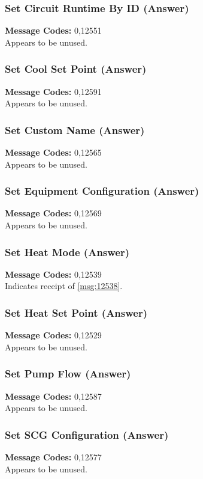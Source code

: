 \documentclass[11pt]{article}
\begin{document}
\subsubsection{Set Circuit Runtime By ID (Answer)}
\label{msg:12551}
{\bf Message Codes: } 0,12551\\
Appears to be unused.

\subsubsection{Set Cool Set Point (Answer)}
\label{msg:12591}
{\bf Message Codes: } 0,12591\\
Appears to be unused.

\subsubsection{Set Custom Name (Answer)}
\label{msg:12565}
{\bf Message Codes: } 0,12565\\
Appears to be unused.

\subsubsection{Set Equipment Configuration (Answer)}
\label{msg:12569}
{\bf Message Codes: } 0,12569\\
Appears to be unused.

\subsubsection{Set Heat Mode (Answer)}
\label{msg:12539}
{\bf Message Codes: } 0,12539\\
Indicates receipt of \ref{msg:12538}.

\subsubsection{Set Heat Set Point (Answer)}
\label{msg:12529}
{\bf Message Codes: } 0,12529\\
Appears to be unused.

\subsubsection{Set Pump Flow (Answer)}
\label{msg:12587}
{\bf Message Codes: } 0,12587\\
Appears to be unused.

\subsubsection{Set SCG Configuration (Answer)}
\label{msg:12577}
{\bf Message Codes: } 0,12577\\
Appears to be unused.
\end{document}
